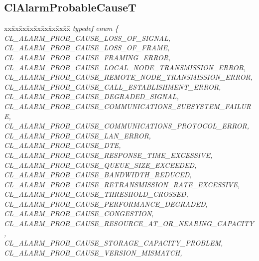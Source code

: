 \begin{flushleft}
\subsection{ClAlarmProbableCauseT}
\begin{tabbing}
xx\=xx\=xx\=xx\=xx\=xx\=xx\=xx\=xx\=\kill
\textit{typedef enum \{}\\
\>\>\>\>\textit{CL\_ALARM\_PROB\_CAUSE\_LOSS\_OF\_SIGNAL,}\\
\>\>\>\>\textit{CL\_ALARM\_PROB\_CAUSE\_LOSS\_OF\_FRAME,}\\
\>\>\>\>\textit{CL\_ALARM\_PROB\_CAUSE\_FRAMING\_ERROR,}\\
\>\>\>\>\textit{CL\_ALARM\_PROB\_CAUSE\_LOCAL\_NODE\_TRANSMISSION\_ERROR,}\\
\>\>\>\>\textit{CL\_ALARM\_PROB\_CAUSE\_REMOTE\_NODE\_TRANSMISSION\_ERROR,}\\
\>\>\>\>\textit{CL\_ALARM\_PROB\_CAUSE\_CALL\_ESTABLISHMENT\_ERROR,}\\
\>\>\>\>\textit{CL\_ALARM\_PROB\_CAUSE\_DEGRADED\_SIGNAL,}\\
\>\>\>\>\textit{CL\_ALARM\_PROB\_CAUSE\_COMMUNICATIONS\_SUBSYSTEM\_FAILURE,}\\
\>\>\>\>\textit{CL\_ALARM\_PROB\_CAUSE\_COMMUNICATIONS\_PROTOCOL\_ERROR,}\\
\>\>\>\>\textit{CL\_ALARM\_PROB\_CAUSE\_LAN\_ERROR,}\\
\>\>\>\>\textit{CL\_ALARM\_PROB\_CAUSE\_DTE,}\\
\>\>\>\>\textit{CL\_ALARM\_PROB\_CAUSE\_RESPONSE\_TIME\_EXCESSIVE,}\\
\>\>\>\>\textit{CL\_ALARM\_PROB\_CAUSE\_QUEUE\_SIZE\_EXCEEDED,}\\
\>\>\>\>\textit{CL\_ALARM\_PROB\_CAUSE\_BANDWIDTH\_REDUCED,}\\
\>\>\>\>\textit{CL\_ALARM\_PROB\_CAUSE\_RETRANSMISSION\_RATE\_EXCESSIVE,}\\
\>\>\>\>\textit{CL\_ALARM\_PROB\_CAUSE\_THRESHOLD\_CROSSED,}\\
\>\>\>\>\textit{CL\_ALARM\_PROB\_CAUSE\_PERFORMANCE\_DEGRADED,}\\
\>\>\>\>\textit{CL\_ALARM\_PROB\_CAUSE\_CONGESTION,}\\
\>\>\>\>\textit{CL\_ALARM\_PROB\_CAUSE\_RESOURCE\_AT\_OR\_NEARING\_CAPACITY,}\\
\>\>\>\>\textit{CL\_ALARM\_PROB\_CAUSE\_STORAGE\_CAPACITY\_PROBLEM,}\\
\>\>\>\>\textit{CL\_ALARM\_PROB\_CAUSE\_VERSION\_MISMATCH,}\\

\end{tabbing}
\end{flushleft}
